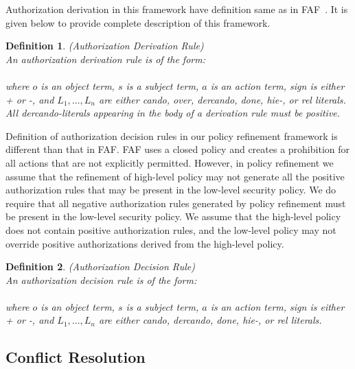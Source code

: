 \documentclass[12pt,journal,letterpaper,onecolumn]{IEEEtran}
\newtheorem{definition}{Definition}[section]
\begin{document}
Authorization derivation in this framework have definition same as
in FAF~{\cite{Jajodia01}}. It is given below to provide complete
description of this framework.

\begin{definition}(Authorization Derivation Rule)\\
An {\em authorization derivation} rule is of the form:\\
\indent\indent{}\\
where $o$ is an object term, $s$ is a subject term,  $a$ is an
action term,  sign is either + or -, and $L_1, \ldots , L_n$ are
either cando, over, dercando, done, hie-, or rel literals. All
dercando-literals appearing in the body of a derivation rule must be
positive. \label{def:authorizationderivationrule}
\end{definition}

Definition of authorization decision rules in our policy refinement
framework is different than that in FAF. FAF uses a closed policy
and creates a prohibition for all actions that are not explicitly
permitted. However, in policy refinement we assume that the
refinement of high-level policy may not generate all the positive
authorization rules that may be present in the low-level security
policy. We do require that all negative authorization rules generated
by policy refinement must be present in the low-level security
policy. We assume that the high-level policy does not contain
positive authorization rules, and the low-level policy may not override
positive authorizations derived from the high-level policy.

\begin{definition}(Authorization Decision Rule)\\
An {\em authorization decision} rule is of the form:\\
\indent\indent{}\\
where $o$ is an object term, $s$ is a subject term,  $a$ is an
action term,  sign is either + or -, and $L_1, \ldots , L_n$ are
either cando, dercando, done, hie-, or rel literals.
\label{def:authorizationdecisionrule}
\end{definition}


\subsection{Conflict Resolution}
\end{document}
